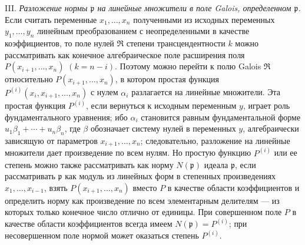 \documentclass[11pt]{article}
\providecommand{\frakp}{\mathfrak p}
\providecommand{\frakR}{\mathfrak R}
\begin{document}
\noindent III. \emph{Разложение нормы $\frakp$ на линейные множители в поле Galois, определенном $\frakp$.} Если считать переменные $x_1,\ldots,x_n$ полученными из исходных переменных $y_1,\ldots,y_n$ линейным преобразованием с неопределенными в качестве коэффициентов, то поле нулей $\frakR$ степени трансцендентности $k$ можно рассматривать как конечное алгебраическое поле расширения поля $P(x_{i+1},\ldots,x_n)$ $(k=n-i)$. Поэтому можно перейти к полю Galois $\frakR$ относительно $P(x_{i+1},\ldots,x_n)$, в котором простая функция $P^{(i)}(x_i,x_{i+1},\ldots,x_n)$ с нулем $\alpha_i$ разлагается на линейные множители. Эта простая функция $P^{(i)}$, если вернуться к исходным переменным $y$, играет роль фундаментального уравнения; ибо $\alpha_i$ становится равным фундаментальной форме $u_1\beta_1+\cdots+u_n\beta_n$, где $\beta$ обозначает систему нулей в переменных $y$, алгебраически зависящую от параметров $x_{i+1},\ldots,x_n$; следовательно, разложение на линейные множители дает произведение по всем нулям. Но простую функцию $P^{(i)}$ или ее степень можно также рассматривать как норму $N(\frakp)$ идеала $\frakp$, если рассматривать $\frakp$ как модуль из линейных форм в степенных произведениях $x_1,\ldots,x_{i-1}$, взять $P(x_{i+1},\ldots,x_n)$ вместо $P$ в качестве области коэффициентов и определить норму как произведение по всем элементарным делителям --- из которых только конечное число отлично от единицы. При совершенном поле $P$ в качестве области коэффициентов всегда имеем $N(\frakp)=P^{(i)}$; при несовершенном поле нормой может оказаться степень $P^{(i)}$.
\end{document}
